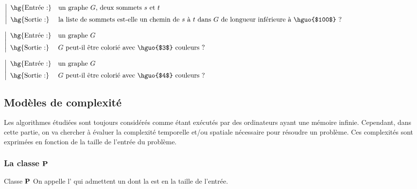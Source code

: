 \documentclass[a4paper,french,bookmarks]{book}
\newcommand{\cP}{\bbP}
\begin{document}
    \begin{example}{}{}
        \begin{enumerate}
            \itt \( \left\vert\begin{array}{ll}
                \text{\hg{Entrée :}} & \text{un graphe $G$, deux sommets $s$ et $t$}  \\[0.2cm]
                \text{\hg{Sortie :}} & \text{la liste de sommets est-elle un chemin de $s$ à $t$ dans $G$ de longueur inférieure à \hguo{$100$} ?}
            \end{array}\right.\)
            
            \itt \( \left\vert\begin{array}{ll}
                \text{\hg{Entrée :}} & \text{un graphe $G$}  \\[0.2cm]
                \text{\hg{Sortie :}} & \text{$G$ peut-il être colorié avec \hguo{$3$} couleurs ?}
            \end{array}\right.\)
            
            \itt \( \left\vert\begin{array}{ll}
                \text{\hg{Entrée :}} & \text{un graphe $G$}  \\[0.2cm]
                \text{\hg{Sortie :}} & \text{$G$ peut-il être colorié avec \hguo{$4$} couleurs ?}
            \end{array}\right.\)
        \end{enumerate}
    \end{example}

    \subsection{Modèles de complexité}

    Les algorithmes étudiées sont toujours considérés comme étant exécutés par des ordinateurs ayant une mémoire infinie. Cependant, dans cette partie, on va chercher à évaluer la complexité temporelle et/ou spatiale nécessaire pour résoudre un problème. Ces complexités sont exprimées en fonction de la taille de l'entrée du problème.
    
    \subsubsection{La classe $\cP$}

    \begin{definition}{Classe $\cP$}{}
        On appelle \hg{classe $\cP$} l' qui admettent un  dont la  est  en la taille de l'entrée.
    \end{definition}
\end{document}
